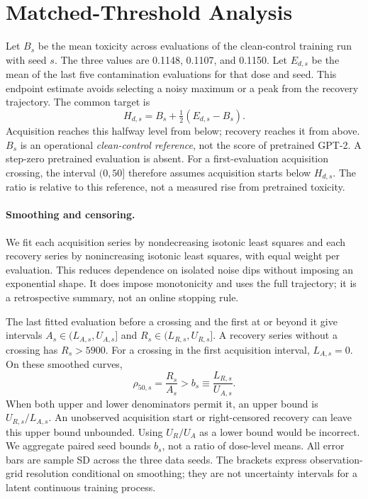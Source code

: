 \documentclass[11pt,a4paper]{article}
\begin{document}
\section{Matched-Threshold Analysis}
\label{sec:analysis}
Let $B_s$ be the mean toxicity across evaluations of the clean-control training run with seed $s$. The three values are 0.1148, 0.1107, and 0.1150. Let $E_{d,s}$ be the mean of the last five contamination evaluations for that dose and seed. This endpoint estimate avoids selecting a noisy maximum or a peak from the recovery trajectory. The common target is
\begin{equation}
H_{d,s}=B_s+\tfrac12(E_{d,s}-B_s).
\label{eq:target}
\end{equation}
Acquisition reaches this halfway level from below; recovery reaches it from above. $B_s$ is an operational \emph{clean-control reference}, not the score of pretrained GPT-2. A step-zero pretrained evaluation is absent. For a first-evaluation acquisition crossing, the interval $(0,50]$ therefore assumes acquisition starts below $H_{d,s}$. The ratio is relative to this reference, not a measured rise from pretrained toxicity.

\paragraph{Smoothing and censoring.}
We fit each acquisition series by nondecreasing isotonic least squares and each recovery series by nonincreasing isotonic least squares, with equal weight per evaluation. This reduces dependence on isolated noise dips without imposing an exponential shape. It does impose monotonicity and uses the full trajectory; it is a retrospective summary, not an online stopping rule.

The last fitted evaluation before a crossing and the first at or beyond it give intervals $A_s\in(L_{A,s},U_{A,s}]$ and $R_s\in(L_{R,s},U_{R,s}]$. A recovery series without a crossing has $R_s>5900$. For a crossing in the first acquisition interval, $L_{A,s}=0$. On these smoothed curves,
\begin{equation}
\rho_{50,s}=\frac{R_s}{A_s}>b_s
\equiv\frac{L_{R,s}}{U_{A,s}}.
\label{eq:ratio}
\end{equation}
When both upper and lower denominators permit it, an upper bound is $U_{R,s}/L_{A,s}$. An unobserved acquisition start or right-censored recovery can leave this upper bound unbounded. Using $U_R/U_A$ as a lower bound would be incorrect. We aggregate paired seed bounds $b_s$, not a ratio of dose-level means. All error bars are sample SD across the three data seeds. The brackets express observation-grid resolution conditional on smoothing; they are not uncertainty intervals for a latent continuous training process.
\end{document}
